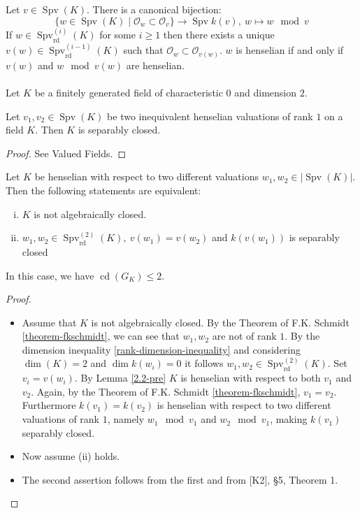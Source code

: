 \begin{lemma}\label{2.2-pre}
Let $v\in\operatorname{Spv}(K)$. There is a canonical bijection:
\[\{ w\in\operatorname{Spv}(K)\mid \mathcal{O}_w\subset\mathcal{O}_v \} \to \operatorname{Spv}k(v),\ w\mapsto w\mod v\]
If $w\in\operatorname{Spv}_\text{rd}^{(i)}(K)$ for some $i\geq 1$ then there exists a unique $v(w)\in\operatorname{Spv}_\text{rd}^{(i-1)}(K)$ such that $\mathcal{O}_w\subset\mathcal{O}_{v(w)}$. $w$ is henselian if and only if $v(w)$ and $w\mod v(w)$ are henselian.
\end{lemma}

\paragraph{} Let $K$ be a finitely generated field of characteristic $0$ and dimension $2$.

\begin{theorem}\label{theorem-fkschmidt}
Let $v_1,v_2\in\operatorname{Spv}(K)$ be two inequivalent henselian valuations of rank $1$ on a field $K$. Then $K$ is separably closed.
\end{theorem}

\begin{proof}
See Valued Fields.
\end{proof}

\begin{lemma}\label{2.2}
Let $K$ be henselian with respect to two different valuations $w_1,w_2\in |\operatorname{Spv}(K)|$. Then the following statements are equivalent: 
\begin{enumerate}[(i)]
\item $K$ is not algebraically closed.
\item $w_1,w_2\in\operatorname{Spv}_\text{rd}^{(2)}(K),\ v(w_1)=v(w_2)$ and $k(v(w_1))$ is separably closed
\end{enumerate}
In this case, we have $\operatorname{cd}(G_K)\leq 2$.
\end{lemma}

\begin{proof}
\begin{itemize}
\item Assume that $K$ is not algebraically closed. By the Theorem of F.K. Schmidt \ref{theorem-fkschmidt}, we can see that $w_1,w_2$ are not of rank $1$. By the dimension inequality \ref{rank-dimension-inequality} and considering $\dim(K) = 2$ and $\dim k(w_i) = 0$ it follows $w_1,w_2\in\operatorname{Spv}^{(2)}_\text{rd}(K)$. Set $v_i=v(w_i)$. By Lemma \ref{2.2-pre} $K$ is henselian with respect to both $v_1$ and $v_2$. Again, by the Theorem of F.K. Schmidt \ref{theorem-fkschmidt}, $v_1 = v_2$. Furthermore $k(v_1) = k(v_2)$ is henselian with respect to two different valuations of rank $1$, namely $w_1\mod v_1$ and $w_2\mod v_1$, making $k(v_1)$ separably closed.
\item Now assume (ii) holds.
\item The second assertion follows from the first and from [K2], §5, Theorem 1.\qedhere
\end{itemize}
\end{proof}

